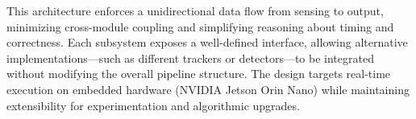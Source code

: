 \documentclass[11pt, letterpaper]{article}
\begin{document}
\noindent
This architecture enforces a unidirectional data flow from sensing to
output, minimizing cross-module coupling and simplifying reasoning
about timing and correctness.  Each subsystem exposes a well-defined
interface, allowing alternative implementations---such as different
trackers or detectors---to be integrated without modifying the overall
pipeline structure.  The design targets real-time execution on embedded
hardware (NVIDIA Jetson Orin Nano) while maintaining extensibility for
experimentation and algorithmic upgrades.
\end{document}
